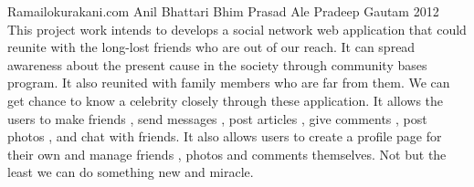  \begin{conf-abstract}[]
{Ramailokurakani.com}
{
Anil Bhattari
Bhim Prasad Ale
Pradeep Gautam
}	
{2012}
This project work intends to develops a social network web application that could reunite 
with the long-lost friends who are out of our reach. It can spread awareness about the 
present cause in the society through community bases program. It also reunited with
family members who are far from them. We can get chance to know a celebrity closely 
through these application. It allows the users to make friends , send messages , post
articles , give comments , post photos , and chat with friends. It also allows users to create a
profile page for their own and manage friends , photos and comments themselves. Not but
the least we can do something new and miracle.
  \end{conf-abstract}